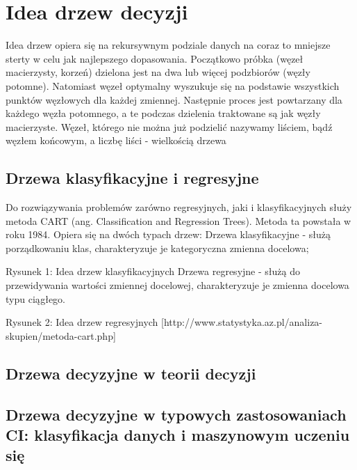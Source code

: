 \documentclass[10pt,a4paper]{article}
\begin{document}
\section{Idea drzew decyzji}
Idea drzew opiera się na rekursywnym podziale danych na coraz to mniejsze sterty w celu jak najlepszego dopasowania. Początkowo próbka (węzeł macierzysty, korzeń) dzielona jest na dwa lub więcej podzbiorów (węzły potomne). Natomiast węzeł optymalny wyszukuje się na podstawie wszystkich punktów węzłowych dla każdej zmiennej. Następnie proces jest powtarzany dla każdego węzła potomnego, a te podczas dzielenia traktowane są jak węzły macierzyste. Węzeł, którego nie można już podzielić nazywamy liściem, bądź węzłem końcowym, a liczbę liści - wielkością drzewa

\subsection{Drzewa klasyfikacyjne i regresyjne}
Do rozwiązywania problemów zarówno regresyjnych, jaki i klasyfikacyjnych służy metoda CART (ang. Classification and Regression Trees). Metoda ta powstała w roku 1984. Opiera się na dwóch typach drzew:
Drzewa klasyfikacyjne - służą porządkowaniu klas, charakteryzuje je kategoryczna zmienna docelowa;
 

 


Rysunek 1: Idea drzew klasyfikacyjnych
Drzewa regresyjne - służą do przewidywania wartości zmiennej docelowej, charakteryzuje je zmienna docelowa typu ciągłego.
 


Rysunek 2: Idea drzew regresyjnych
[http://www.statystyka.az.pl/analiza-skupien/metoda-cart.php]

\subsection{Drzewa decyzyjne w teorii decyzji}
\subsection{Drzewa decyzyjne w typowych zastosowaniach CI: klasyfikacja danych i maszynowym uczeniu się}
\end{document}
